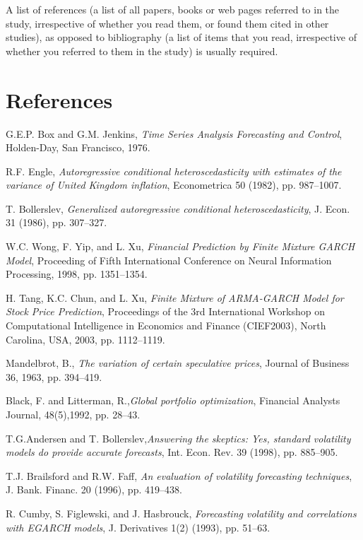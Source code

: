 A list of references (a list of all papers, books or web pages referred to in the study, irrespective of whether you read them, or found them cited in other studies), as opposed to bibliography (a list of items that you read, irrespective of whether you referred to them in the study) is usually required.

\chapter{References}

\begin{thebibliography}{9}
G.E.P. Box and G.M. Jenkins, \textit{Time Series Analysis Forecasting and Control}, Holden-Day, San Francisco, 1976.

R.F. Engle, \textit{Autoregressive conditional heteroscedasticity with estimates of the variance of United Kingdom inflation}, Econometrica 50 (1982), pp. 987–1007.

T. Bollerslev, \textit{Generalized autoregressive conditional heteroscedasticity}, J. Econ. 31 (1986), pp. 307–327.

W.C. Wong, F. Yip, and L. Xu, \textit{Financial Prediction by Finite Mixture GARCH Model}, Proceeding of Fifth International Conference on Neural Information Processing, 1998, pp. 1351–1354.

H. Tang, K.C. Chun, and L. Xu, \textit{Finite Mixture of ARMA-GARCH Model for Stock Price Prediction}, Proceedings of the 3rd International Workshop on Computational Intelligence in Economics and Finance (CIEF2003), North
Carolina, USA, 2003, pp. 1112–1119.

Mandelbrot, B., \textit{The variation of certain speculative prices}, Journal of Business 36, 1963, pp. 394–419.

Black, F. and Litterman, R.,\textit{Global portfolio optimization}, Financial Analysts Journal, 48(5),1992, pp. 28–43.

T.G.Andersen and T. Bollerslev,\textit{Answering the skeptics: Yes, standard volatility models do provide accurate forecasts}, Int. Econ. Rev. 39 (1998), pp. 885–905.

T.J. Brailsford and R.W. Faff, \textit{An evaluation of volatility forecasting techniques}, J. Bank. Financ. 20 (1996), pp. 419–438.

R. Cumby, S. Figlewski, and J. Hasbrouck, \textit{Forecasting volatility and correlations with EGARCH models}, J. Derivatives 1(2) (1993), pp. 51–63.


\end{thebibliography}
